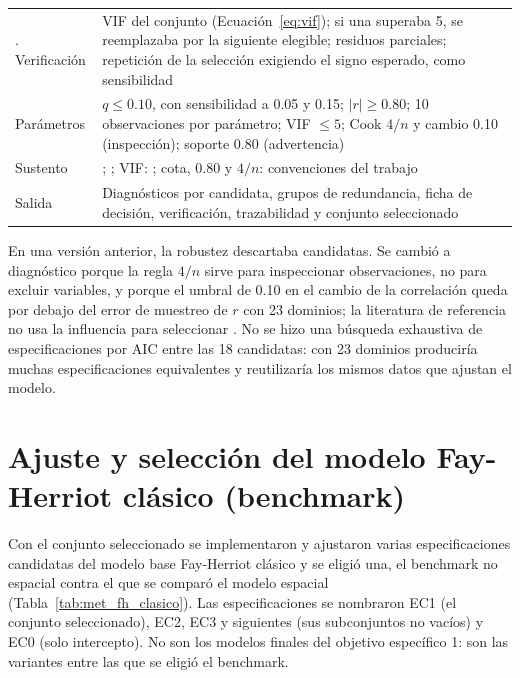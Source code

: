 \begin{table}[!htbp]
\begin{tabularx}{\linewidth}{>{\raggedright\arraybackslash}p{2.8cm} >{\raggedright\arraybackslash}X}
5. Verificación & VIF del conjunto (Ecuación~\ref{eq:vif}); si una superaba 5, se reemplazaba por la siguiente elegible; residuos parciales; repetición de la selección exigiendo el signo esperado, como sensibilidad \\
Parámetros & $q \leq 0.10$, con sensibilidad a 0.05 y 0.15; $|r| \geq 0.80$; 10 observaciones por parámetro; VIF $\leq 5$; Cook $4/n$ y cambio 0.10 (inspección); soporte 0.80 (advertencia) \\
Sustento & \cite[pp.~453--454]{morales2021smallarea}; \cite{BenjaminiHochberg1995}; VIF: \cite[sec.~9.4]{MontgomeryPeckVining2012}; cota, 0.80 y $4/n$: convenciones del trabajo \\
Salida & Diagnósticos por candidata, grupos de redundancia, ficha de decisión, verificación, trazabilidad y conjunto seleccionado \\
\bottomrule
\end{tabularx}
\end{table}

En una versión anterior, la robustez descartaba candidatas. Se cambió a diagnóstico porque la regla $4/n$ sirve para inspeccionar observaciones, no para excluir variables, y porque el umbral de 0.10 en el cambio de la correlación queda por debajo del error de muestreo de $r$ con 23 dominios; la literatura de referencia no usa la influencia para seleccionar \cite[pp.~453--454]{morales2021smallarea}. No se hizo una búsqueda exhaustiva de especificaciones por AIC entre las 18 candidatas: con 23 dominios produciría muchas especificaciones equivalentes y reutilizaría los mismos datos que ajustan el modelo.

\section{Ajuste y selección del modelo Fay-Herriot clásico (benchmark)}
\label{sec:met_fh_clasico}

Con el conjunto seleccionado se implementaron y ajustaron varias especificaciones candidatas del modelo base Fay-Herriot clásico y se eligió una, el benchmark no espacial contra el que se comparó el modelo espacial (Tabla~\ref{tab:met_fh_clasico}). Las especificaciones se nombraron EC1 (el conjunto seleccionado), EC2, EC3 y siguientes (sus subconjuntos no vacíos) y EC0 (solo intercepto). No son los modelos finales del objetivo específico 1: son las variantes entre las que se eligió el benchmark.

